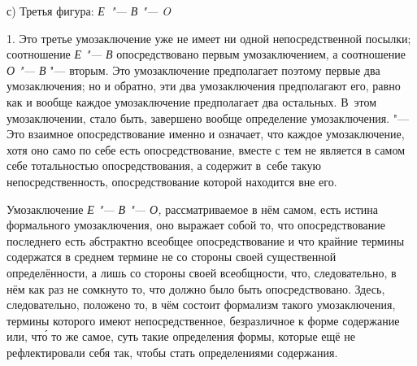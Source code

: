 {с) Третья фигура: {\em Е~"--- В "--- O}}

1. Это третье умозаключение уже не имеет ни одной
непосредственной посылки; соотношение {\em Е "--- В}
опосредствовано первым умозаключением, а соотношение
{\em О "--- В} "--- вторым. Это умозаключение предполагает поэтому первые два
умозаключения; но и обратно, эти два умозаключения предполагают его, равно
как и вообще каждое умозаключение предполагает два остальных. В~этом
умозаключении, стало быть, завершено вообще определение умозаключения.
"--- Это взаимное опосредствование именно и означает, что каждое
умозаключение, хотя оно само по себе есть опосредствование, вместе с тем не
является в самом себе тотальностью опосредствования, а содержит в~себе
такую непосредственность, опосредствование которой находится вне его.

Умозаключение {\em Е "--- В "--- О,} рассматриваемое в нём
самом, есть истина формального умозаключения, оно выражает собой то, что
опосредствование последнего есть абстрактно всеобщее опосредствование и что
крайние термины содержатся в среднем термине не со стороны своей
существенной определённости, а лишь со стороны своей всеобщности, что,
следовательно, в нём как раз не сомкнуто то, что должно было быть
опосредствовано. Здесь, следовательно, положено то, в чём состоит формализм
такого умозаключения, термины которого имеют
непосредственное, безразличное к форме содержание или, чт\'{о} то же самое,
суть такие определения формы, которые ещё не рефлектировали себя так, чтобы
стать определениями содержания.

